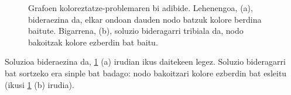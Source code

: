 \documentclass[eu]{ifirak}\usepackage[]{graphicx}\usepackage[]{color}
\begin{document}
\begin{figure}[t]
\caption{Grafoen koloreztatze-problemaren bi adibide. Lehenengoa, (a), bideraezina da, elkar ondoan dauden nodo batzuk kolore berdina baitute. Bigarrena, (b), soluzio bideragarri tribiala da, nodo bakoitzak kolore ezberdin bat baitu.}\label{fig:graph_coloring}
\end{figure}

Soluzioa bideraezina da, \ref{fig:graph_coloring} (a) irudian ikus daitekeen legez. Soluzio bideragarri bat sortzeko era sinple bat badago: nodo bakoitzari kolore ezberdin bat esleitu (ikusi \ref{fig:graph_coloring} (b) irudia).
\end{document}
